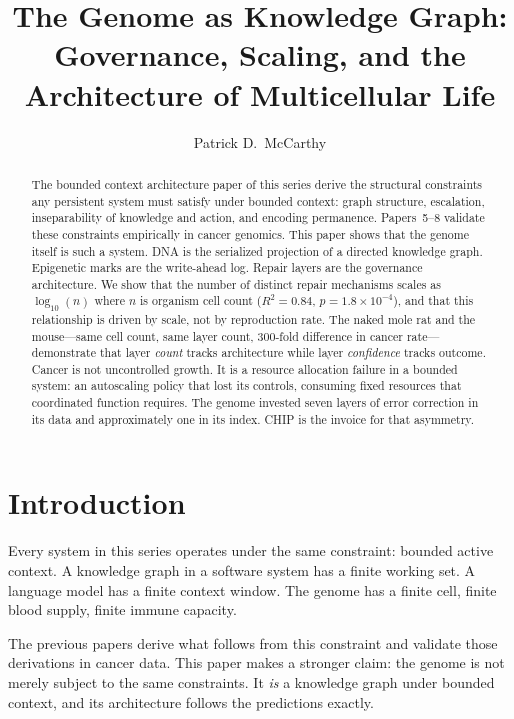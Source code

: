 \documentclass[11pt]{article}
\title{The Genome as Knowledge Graph:\\Governance, Scaling, and the Architecture of Multicellular Life}
\author{Patrick D.\ McCarthy}
\date{}
\theoremstyle{definition}
\begin{document}
\maketitle

\begin{abstract}
The bounded context architecture paper of this series derive the structural constraints any
persistent system must satisfy under bounded context: graph structure,
escalation, inseparability of knowledge and action, and encoding
permanence. Papers~5--8 validate these constraints empirically in
cancer genomics. This paper shows that the genome itself is such a
system. DNA is the serialized projection of a directed knowledge graph.
Epigenetic marks are the write-ahead log. Repair layers are the
governance architecture. We show that the number of distinct repair
mechanisms scales as $\log_{10}(n)$ where $n$ is organism cell count
($R^2 = 0.84$, $p = 1.8 \times 10^{-4}$), and that this relationship
is driven by scale, not by reproduction rate. The naked mole rat and
the mouse---same cell count, same layer count, 300-fold difference in
cancer rate---demonstrate that layer \emph{count} tracks architecture
while layer \emph{confidence} tracks outcome. Cancer is not uncontrolled
growth. It is a resource allocation failure in a bounded system: an
autoscaling policy that lost its controls, consuming fixed resources
that coordinated function requires. The genome invested seven layers
of error correction in its data and approximately one in its index.
CHIP is the invoice for that asymmetry.
\end{abstract}

\section{Introduction}
\label{sec:intro}

Every system in this series operates under the same constraint: bounded
active context. A knowledge graph in a software system has a finite
working set. A language model has a finite context window. The genome
has a finite cell, finite blood supply, finite immune capacity.

The previous papers derive what follows from this constraint and
validate those derivations in cancer data. This paper makes a stronger
claim: the genome is not merely subject to the same constraints. It
\emph{is} a knowledge graph under bounded context, and its architecture
follows the predictions exactly.
\end{document}
